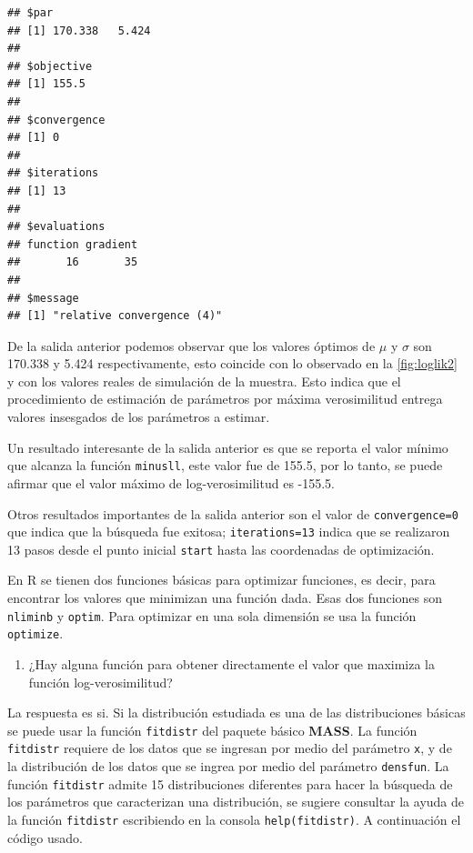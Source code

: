 \documentclass[10pt,]{krantz}
\providecommand{\tightlist}{%
  \setlength{\itemsep}{0pt}\setlength{\parskip}{0pt}}
\let\proglang=\textsf
\let\BeginKnitrBlock\begin \let\EndKnitrBlock\end
\begin{document}
\begin{verbatim}
## $par
## [1] 170.338   5.424
## 
## $objective
## [1] 155.5
## 
## $convergence
## [1] 0
## 
## $iterations
## [1] 13
## 
## $evaluations
## function gradient 
##       16       35 
## 
## $message
## [1] "relative convergence (4)"
\end{verbatim}

De la salida anterior podemos observar que los valores óptimos de
\(\mu\) y \(\sigma\) son 170.338 y 5.424 respectivamente, esto coincide
con lo observado en la \ref{fig:loglik2} y con los valores reales de
simulación de la muestra. Esto indica que el procedimiento de estimación
de parámetros por máxima verosimilitud entrega valores insesgados de los
parámetros a estimar.

Un resultado interesante de la salida anterior es que se reporta el
valor mínimo que alcanza la función \texttt{minusll}, este valor fue de
155.5, por lo tanto, se puede afirmar que el valor máximo de
log-verosimilitud es -155.5.

Otros resultados importantes de la salida anterior son el valor de
\texttt{convergence=0} que indica que la búsqueda fue exitosa;
\texttt{iterations=13} indica que se realizaron 13 pasos desde el punto
inicial \texttt{start} hasta las coordenadas de optimización.

\BeginKnitrBlock{rmdnote}
En \proglang{R} se tienen dos funciones básicas para optimizar
funciones, es decir, para encontrar los valores que minimizan una
función dada. Esas dos funciones son \texttt{nliminb} y \texttt{optim}.
Para optimizar en una sola dimensión se usa la función
\texttt{optimize}.
\EndKnitrBlock{rmdnote}

\begin{enumerate}
\def\labelenumi{\arabic{enumi})}
\setcounter{enumi}{3}
\tightlist
\item
  ¿Hay alguna función para obtener directamente el valor que maximiza la
  función log-verosimilitud?
\end{enumerate}

La respuesta es si. Si la distribución estudiada es una de las
distribuciones básicas se puede usar la función \texttt{fitdistr} del
paquete básico \textbf{MASS}. La función \texttt{fitdistr} requiere de
los datos que se ingresan por medio del parámetro \texttt{x}, y de la
distribución de los datos que se ingrea por medio del parámetro
\texttt{densfun}. La función \texttt{fitdistr} admite 15 distribuciones
diferentes para hacer la búsqueda de los parámetros que caracterizan una
distribución, se sugiere consultar la ayuda de la función
\texttt{fitdistr} escribiendo en la consola \texttt{help(fitdistr)}. A
continuación el código usado. 
\end{document}
